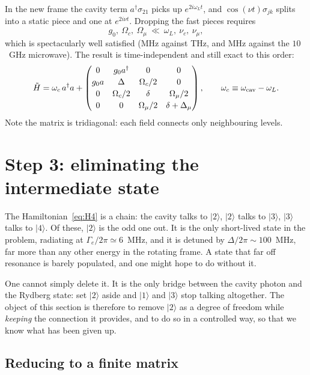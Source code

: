 \documentclass[11pt,a4paper]{article}
\newcommand{\ket}[1]{\lvert #1 \rangle}
\newcommand{\dg}{^{\dagger}}
\newcommand{\Om}{\Omega}
\newcommand{\Omu}{\Omega_{\mu}}
\newcommand{\Dmu}{\Delta_{\mu}}
\begin{document}
In the new frame the cavity term $a\dg\sigma_{21}$ picks up $e^{2i\omega_L t}$, and
$\cos(\nu t)\sigma_{jk}$ splits into a static piece and one at $e^{2i\nu t}$. Dropping the
fast pieces requires
\begin{equation}
  g_0,\ \Om_c,\ \Omu \ \ll\ \omega_L,\ \nu_c,\ \nu_\mu ,
  \tag{A1}
\end{equation}
which is spectacularly well satisfied (MHz against THz, and MHz against the $10$~GHz microwave).
The result is time-independent and still exact to this order:
\begin{equation}
  \tilde H = \omega_c\, a\dg a +
  \begin{pmatrix}
    0        & g_0 a\dg & 0        & 0 \\[2pt]
    g_0 a    & \Delta   & \Om_c/2  & 0 \\[2pt]
    0        & \Om_c/2  & \delta   & \Omu/2 \\[2pt]
    0        & 0        & \Omu/2   & \delta+\Dmu
  \end{pmatrix},
  \qquad \omega_c \equiv \omega_{\rm cav}-\omega_L .
  \label{eq:H4}
\end{equation}
Note the matrix is tridiagonal: each field connects only neighbouring levels.

\section{Step 3: eliminating the intermediate state}

The Hamiltonian~\eqref{eq:H4} is a chain: the cavity talks to $\ket{2}$, $\ket{2}$ talks to
$\ket{3}$, $\ket{3}$ talks to $\ket{4}$. Of these, $\ket{2}$ is the odd one out. It is the only
short-lived state in the problem, radiating at $\Gamma_e/2\pi\simeq6$~MHz, and it is detuned by
$\Delta/2\pi\sim100$~MHz, far more than any other energy in the rotating frame. A state that far
off resonance is barely populated, and one might hope to do without it.

One cannot simply delete it. It is the only bridge between the cavity photon and the Rydberg
state: set $\ket{2}$ aside and $\ket{1}$ and $\ket{3}$ stop talking altogether. The object of
this section is therefore to remove $\ket{2}$ as a degree of freedom while \emph{keeping} the
connection it provides, and to do so in a controlled way, so that we know what has been given up.

\subsection{Reducing to a finite matrix}
\end{document}
